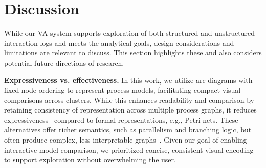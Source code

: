 \documentclass[preprint,journal]{vgtc}            %
\begin{document}

\section{Discussion}
\label{sec:discussion}

While our VA system supports exploration of both structured and unstructured interaction logs and meets the analytical goals, design considerations and limitations are relevant to discuss.
This section highlights these and also considers potential future directions of research.

\noindent
\textbf{Expressiveness vs. effectiveness.} 
In this work, we utilize arc diagrams with fixed node ordering to represent process models, facilitating compact visual comparisons across clusters.
While this enhances readability and comparison by retaining consistency of representation across multiple process graphs, it reduces expressiveness~\cite{Card09Information} compared to formal representations, e.g., Petri nets.
These alternatives offer richer semantics, such as parallelism and branching logic, but often produce complex, less interpretable graphs~\cite{Miksch24Visual}.
Given our goal of enabling interactive model comparison, we prioritized concise, consistent visual encoding to support exploration without overwhelming the user.
\end{document}
